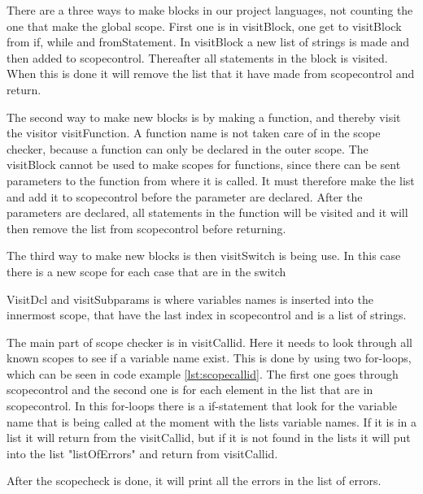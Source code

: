 There are a three ways to make blocks in our project languages, not counting the one that make the global scope. First one is in visitBlock, one get to visitBlock from if, while and fromStatement. In visitBlock a new list of strings is made and then added to scopecontrol. Thereafter all statements in the block is visited. When this is done it will remove the list that it have made from scopecontrol and return.

The second way to make new blocks is by making a function, and thereby visit the visitor visitFunction. A function name is not taken care of in the scope checker, because a function can only be declared in the outer scope. The visitBlock cannot be used to make scopes for functions, since there can be sent parameters to the function from where it is called. It must therefore make the list and add it to scopecontrol before the parameter are declared. After the parameters are declared, all statements in the function will be visited and it will then remove the list from scopecontrol before returning.

The third way to make new blocks is then visitSwitch is being use. In this case there is a new scope for each case that are in the switch

VisitDcl and visitSubparams is where variables names is inserted into the innermost scope, that have the last index in scopecontrol and is a list of strings.

The main part of scope checker is in visitCallid. Here it needs to look through all known scopes to see if a variable name exist. This is done by using two for-loops, which can be seen in code example \ref{lst:scopecallid}. The first one goes through scopecontrol and the second one is for each element in the list that are in scopecontrol. In this for-loops there is a if-statement that look for the variable name that is being called at the moment with the lists variable names. If it is in a list it will return from the visitCallid, but if it is not found in the lists it will put into the list "listOfErrors" and return from visitCallid.


After the scopecheck is done, it will print all the errors in the list of errors.

